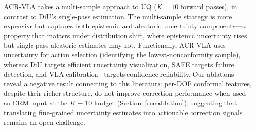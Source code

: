 ACR-VLA takes a multi-sample approach to UQ ($K{=}10$ forward passes), in contrast to DiU's single-pass estimation.
The multi-sample strategy is more expensive but captures both epistemic and aleatoric uncertainty components---a property that matters under distribution shift, where epistemic uncertainty rises but single-pass aleatoric estimates may not.
Functionally, ACR-VLA uses uncertainty for action selection (identifying the lowest-nonconformity sample), whereas DiU targets efficient uncertainty visualization, SAFE targets failure detection, and VLA calibration~\cite{zollo2025vla_calibration} targets confidence reliability.
Our ablations reveal a negative result connecting to this literature: per-DOF conformal features, despite their richer structure, do not improve correction performance when used as CRM input at the $K{=}10$ budget (Section~\ref{sec:ablation}), suggesting that translating fine-grained uncertainty estimates into actionable correction signals remains an open challenge.
